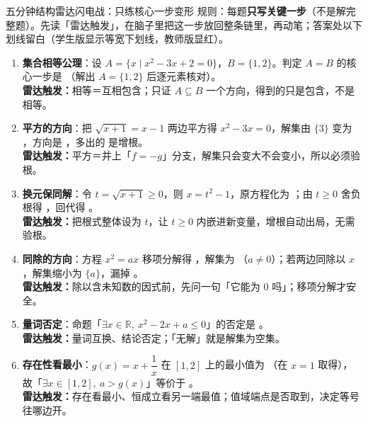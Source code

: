 \begin{warmupbox}{五分钟结构雷达闪电战：只练核心一步变形}
规则：每题\textbf{只写关键一步}（不是解完整题）。先读「雷达触发」，在脑子里把这一步放回整条链里，再动笔；答案处以下划线留白（学生版显示等宽下划线，教师版显红）。

\begin{enumerate}[label=(\arabic*), itemsep=5pt]
\item \textbf{集合相等公理}：设 $A=\{x\mid x^2-3x+2=0\}$，$B=\{1,2\}$。判定 $A=B$ 的核心一步是 （解出 $A=\{1,2\}$ 后逐元素核对）。\\
{\small\bfseries\textcolor{third}{雷达触发：}}相等＝互相包含；只证 $A\subseteq B$ 一个方向，得到的只是包含，不是相等。

\item \textbf{平方的方向}：把 $\sqrt{x+1}=x-1$ 两边平方得 $x^2-3x=0$，解集由 $\{3\}$ 变为 ，方向是 ，多出的  是增根。\\
{\small\bfseries\textcolor{third}{雷达触发：}}平方＝并上「$f=-g$」分支，解集只会变大不会变小，所以必须验根。

\item \textbf{换元保同解}：令 $t=\sqrt{x+1}\ge0$，则 $x=t^2-1$，原方程化为 ；由 $t\ge0$ 舍负根得 ，回代得 。\\
{\small\bfseries\textcolor{third}{雷达触发：}}把根式整体设为 $t$，让 $t\ge0$ 内嵌进新变量，增根自动出局，无需验根。

\item \textbf{同除的方向}：方程 $x^2=ax$ 移项分解得 ，解集为 （$a\ne0$）；若两边同除以 $x$，解集缩小为 $\{a\}$，漏掉 。\\
{\small\bfseries\textcolor{third}{雷达触发：}}除以含未知数的因式前，先问一句「它能为 $0$ 吗」；移项分解才安全。

\item \textbf{量词否定}：命题「$\exists x\in\mathbb{R},\ x^2-2x+a\le0$」的否定是 。\\
{\small\bfseries\textcolor{third}{雷达触发：}}量词互换、结论否定；「无解」就是解集为空集。

\item \textbf{存在性看最小}：$g(x)=x+\dfrac1x$ 在 $[1,2]$ 上的最小值为 （在 $x=1$ 取得），故「$\exists x\in[1,2],\ a>g(x)$」等价于 。\\
{\small\bfseries\textcolor{third}{雷达触发：}}存在看最小、恒成立看另一端最值；值域端点是否取到，决定等号往哪边开。
\end{enumerate}
\end{warmupbox}

